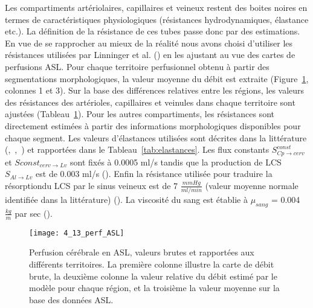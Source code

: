 Les compartiments artériolaires, capillaires et veineux restent des boites noires en termes de
caractéristiques physiologiques (résistances hydrodynamiques, élastance etc.). La définition de la
résistance de ces tubes passe donc par des estimations. En vue de se rapprocher au mieux de la réalité
nous avons choisi d’utiliser les résistances utilisées par Linninger et al. (\cite{Linninger2009}) en les ajustant au vue des cartes
de perfusions ASL. Pour chaque territoire perfusionnel obtenu à partir des segmentations
morphologiques, la valeur moyenne du débit est extraite (Figure~\ref{fig:4_13_perf_ASL}, colonnes 1 et 3). Sur la base des
différences relatives entre les régions, les valeurs des résistances des artérioles, capillaires et veinules
dans chaque territoire sont ajustées (Tableau~\ref{fig:4_13_perf_ASL}). Pour les autres compartiments, les résistances sont
directement estimées à partir des informations morphologiques disponibles pour chaque segment. Les
valeurs d’élastances utilisées sont décrites dans la littérature (\cite{Zagzoule1986},~\cite{Linninger2009},~\cite{Smillie2004}) et rapportées dans le
Tableau~\ref{tab:elastances}. Les flux constants $S^{const}_{Cp\rightarrow cerv}$ et $S{const}_{cerv\rightarrow Lv}$ sont fixés à 0.0005 ml/s tandis que la
production de LCS $S_{Al\rightarrow Lv}$ est de 0.003 ml/s (\cite{Linninger2009}). Enfin la résistance utilisée pour traduire la résorptiondu LCS par le sinus veineux est de 7 $\frac{mmHg}{ ml/min}$ (valeur moyenne normale identifiée dans la littérature) (\cite{Ekstedt1978}). La viscosité du sang est établie à $\mu_{sang}$ = 0.004 $\frac{kg}{ m}$ par sec (\cite{Pedley1980}).\\
\begin{figure}[!t]
\centering
\texttt{[image: 4\_13\_perf\_ASL]}
\caption{Perfusion cérébrale en ASL, valeurs brutes et rapportées aux différents territoires. La première colonne illustre la
carte de débit brute, la deuxième colonne la valeur relative du débit estimé par le modèle pour chaque région, et la troisième
la valeur moyenne sur la base des données ASL.}
\label{fig:4_13_perf_ASL}	
\end{figure}

